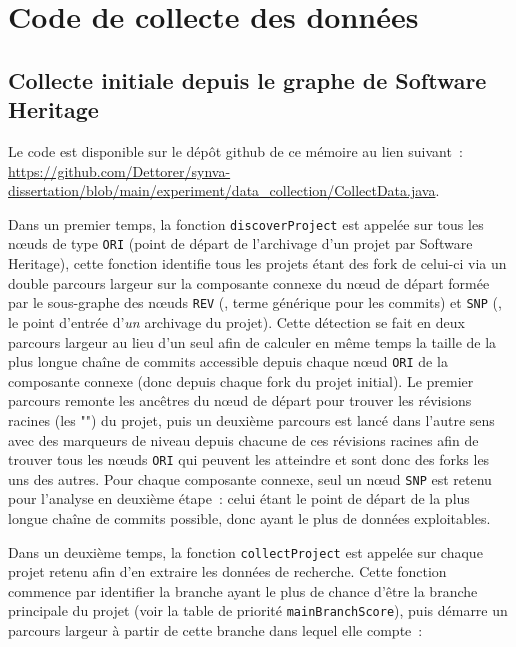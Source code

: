 
\chapter{Code de collecte des données}

\section{Collecte initiale depuis le graphe de Software Heritage}
\label{app:collect.java}

Le code est disponible sur le dépôt \gls{github} de ce mémoire au lien suivant :
\url{https://github.com/Dettorer/synva-dissertation/blob/main/experiment/data_collection/CollectData.java}.


Dans un premier temps, la fonction \texttt{discoverProject} est appelée sur tous les nœuds de type
\texttt{ORI} (point de départ de l'archivage d'un projet par Software Heritage), cette fonction identifie tous
les projets étant des \gls{fork} de celui-ci via un double parcours largeur sur la composante connexe du nœud
de départ formée par le sous-graphe des nœuds \texttt{REV} (, terme générique pour les
\glspl{commit}) et \texttt{SNP} (, le point d'entrée d'\emph{un} archivage du projet). Cette
détection se fait en deux parcours largeur au lieu d'un seul afin de calculer en même temps la taille de la
plus longue chaîne de commits accessible depuis chaque nœud \texttt{ORI} de la composante connexe (donc depuis
chaque \gls{fork} du projet initial). Le premier parcours remonte les ancêtres du nœud de départ pour trouver
les révisions racines (les "") du projet, puis un deuxième parcours est lancé dans
l'autre sens avec des marqueurs de niveau depuis chacune de ces révisions racines afin de trouver tous les
nœuds \texttt{ORI} qui peuvent les atteindre et sont donc des \glspl{fork} les uns des autres. Pour chaque
composante connexe, seul un nœud \texttt{SNP} est retenu pour l'analyse en deuxième étape : celui étant le
point de départ de la plus longue chaîne de \glspl{commit} possible, donc ayant le plus de données
exploitables.

Dans un deuxième temps, la fonction \texttt{collectProject} est appelée sur chaque projet retenu afin d'en
extraire les données de recherche. Cette fonction commence par identifier la branche ayant le plus de chance
d'être la branche principale du projet (voir la table de priorité \texttt{mainBranchScore}), puis démarre un
parcours largeur à partir de cette branche dans lequel elle compte :

